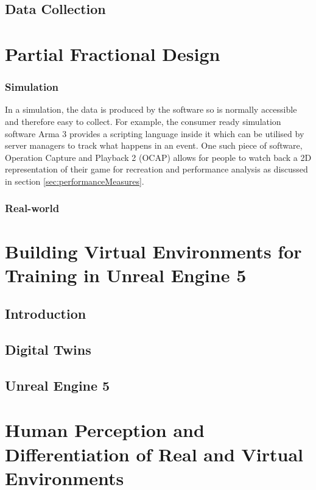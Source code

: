 \documentclass[12pt]{article}
\begin{document}
\subsection{Data Collection}

\section{Partial Fractional Design}

\subsubsection{Simulation}

In a simulation, the data is produced by the software so is normally accessible and therefore easy to collect. For example, the consumer ready simulation software Arma 3 provides a scripting language inside it which can be utilised by server managers to track what happens in an event. One such piece of software, Operation Capture and Playback 2 (OCAP) allows for people to watch back a 2D representation of their game for recreation and performance analysis as discussed in section \ref{sec:performanceMeasures}.

\subsubsection{Real-world}

\section{Building Virtual Environments for Training in Unreal Engine 5}

\subsection{Introduction}

\subsection{Digital Twins}

\subsection{Unreal Engine 5}

\section{Human Perception and Differentiation of Real and Virtual Environments}
\end{document}
